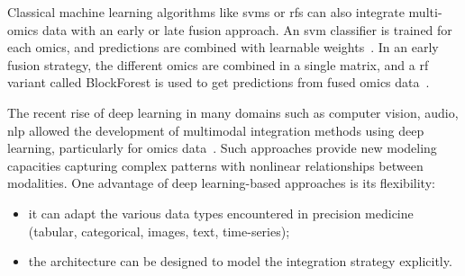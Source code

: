 \documentclass[../main.tex]{subfiles}
\begin{document}
		Classical machine learning algorithms like \glspl{svm} or \glspl{rf} can also integrate multi-omics data with an early or late fusion approach.
		An \gls{svm} classifier is trained for each omics, and predictions are combined with learnable weights~\cite{CarrilloPerez2022}.
		In an early fusion strategy, the different omics are combined in a single matrix, and a \gls{rf} variant called BlockForest is used to get predictions from fused omics data~\cite{Hornung2019}.

		The recent rise of deep learning in many domains such as computer vision, audio, \gls{nlp} allowed the development of multimodal integration methods using deep learning, particularly for omics data~\cite{Kang2021}.
		Such approaches provide new modeling capacities capturing complex patterns with nonlinear relationships between modalities.
		One advantage of deep learning-based approaches is its flexibility:
		\begin{itemize}[nosep]
			\item it can adapt the various data types encountered in precision medicine (tabular, categorical, images, text, time-series);
			\item the architecture can be designed to model the integration strategy explicitly.
		\end{itemize}

\end{document}
